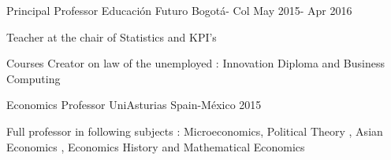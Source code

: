 \begin{cventries}
  \cventry
    {Principal Professor} %
    {Educación Futuro} %
    {Bogotá- Col} %
    {May 2015- Apr 2016} %
    {
      \begin{cvitems} %
        \item {Teacher at the chair of Statistics and KPI's}
        \item {Courses Creator on law of the unemployed : Innovation Diploma and Business Computing}
      \end{cvitems}
    }

  \cventry
    {Economics Professor} %
    {UniAsturias} %
    {Spain-México } %
    {2015} %
    {
      \begin{cvitems} %
        \item {Full professor in following subjects : Microeconomics, Political Theory , Asian Economics , Economics History and Mathematical Economics}
      \end{cvitems}
    }

\end{cventries}
